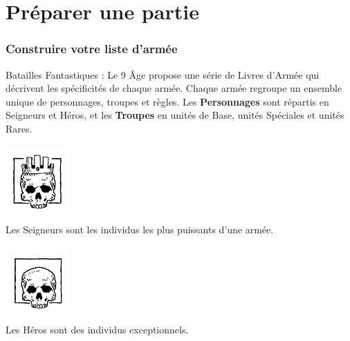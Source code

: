 
\part{Préparer une partie}

\section{Construire votre liste d'armée}
\label{building_an_army}

Batailles Fantastiques : Le 9\ieme{} Âge propose une série de Livres d'Armée qui décrivent les spécificités de chaque armée. Chaque armée regroupe un ensemble unique de personnages, troupes et règles. Les \textbf{Personnages} sont répartis en Seigneurs et Héros, et les \textbf{Troupes} en unités de Base, unités Spéciales et unités Rares.

\noindent\hspace*{\fill} \begin{minipage}[t]{0.3\textwidth}
\begin{center}\includegraphics[width=2.5cm]{../Layout/pics/logo_lord.png}

Les Seigneurs sont les individus les plus puissants d'une armée.
\end{center}
\end{minipage}\hspace*{1cm}
\begin{minipage}[t]{0.3\textwidth}
\begin{center}\includegraphics[width=2.5cm]{../Layout/pics/logo_hero.png}

Les Héros sont des individus exceptionnels.
\end{center}
\end{minipage}\hspace*{\fill}

